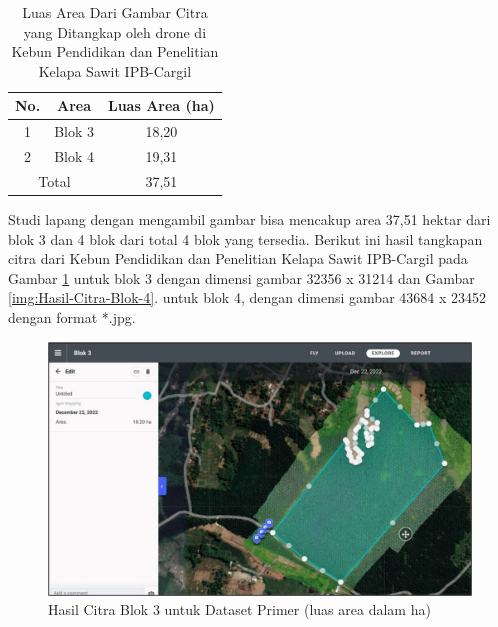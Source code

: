 \begin{enumerate}
	\begin{singlespace}
		\begin{table}[H]
			\centering
			\caption{Luas Area Dari Gambar Citra yang Ditangkap oleh drone di Kebun Pendidikan dan Penelitian Kelapa Sawit IPB-Cargil}
			\label{tbl:Luas-Area-Dari-Gambar-Citra}
			\begin{tabular}{|cc|c|}
				\hline
				\multicolumn{1}{|c|}{No.} & Area   & Luas Area (ha) \\ \hline
				\multicolumn{1}{|c|}{1}   & Blok 3 & 18,20          \\ \hline
				\multicolumn{1}{|c|}{2}   & Blok 4 & 19,31          \\ \hline
				\multicolumn{2}{|c|}{Total}        & 37,51          \\ \hline
			\end{tabular}
		\end{table}
	\end{singlespace}
	
	Studi lapang dengan mengambil gambar bisa mencakup area 37,51 hektar dari blok 3 dan 4 blok dari total 4 blok yang tersedia. Berikut ini hasil tangkapan citra dari Kebun Pendidikan dan Penelitian Kelapa Sawit IPB-Cargil pada Gambar \ref{img:Hasil-Citra-Blok-3} untuk blok 3 dengan dimensi gambar 32356 x 31214 dan Gambar \ref{img:Hasil-Citra-Blok-4}. untuk blok 4, dengan dimensi gambar 43684 x 23452 dengan format *.jpg.
	
	\begin{figure}[H]
		\vspace{-0.1cm}
		\begin{center}
			\includegraphics[width=1\columnwidth]{bab3/Gambar/Picture6.jpg}
		\end{center}
		\vspace{-0.2cm}
		\captionsetup{justification=centering}
		\caption{Hasil Citra Blok 3 untuk Dataset Primer (luas area dalam ha)}\label{img:Hasil-Citra-Blok-3}
	\end{figure}
	

\end{enumerate}
